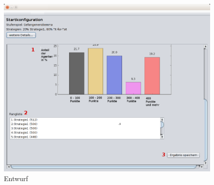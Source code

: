\begin{figure}[htbp] 
  \centering
     \includegraphics[width=1.2\textwidth]{GUI_Entwurf/Ergebnisfenster2.png}
  \caption{Entwurf}
  \label{fig:Bild1}
\end{figure}

